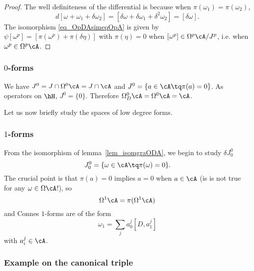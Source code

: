 \begin{proof}
	The well definiteness of the differential is because when $\pi(\omega_1)=\pi(\omega_2)$,
	\[
		d[\omega+\omega_1+\delta\omega_2]=[\delta\omega+\delta\omega_1+\delta^2\omega_2]
		=[\delta\omega].
	\]
	The isomorphism \eqref{eq_OpDAsimeqOpA} is given by   $\psi[\omega^p]=[\pi(\omega^p)+\pi(\delta\eta)]$ with $\pi(\eta)=0$ when $[\omega^p]\in\Omega^p\cA/J^p$, i.e. when $\omega^p\in\Omega^p\cA$.
\end{proof}

\subsubsection{\texorpdfstring{$0$}{t}-forms}

We have $J^0=J\cap\Omega^0\cA=J\cap\cA$ and $J^0=\{ a\in\cA\tq \pi(a)=0 \}$. As operators on $\hH$, $J^0=\{ 0 \}$. Therefore $\Omega^0_D\cA=\Omega^0\cA=\cA$.

Let us now briefly study the spaces of low degree forms.

\subsubsection{\texorpdfstring{$1$}{1}-forms}

From the isomorphism of lemma~\ref{lem_isomgraODA}, we begin to study $\delta J_0^0$
\[
	J_0^0=\{ \omega\in\cA\tq\pi(\omega)=0 \}.
\]
The crucial point is that $\pi(a)=0$ implies $a=0$ when $a\in\cA$ (is is not true for any $\omega\in\Omega\cA$!), so
\begin{equation}
	\Omega^1\cA=\pi(\Omega^1\cA)
\end{equation}
and Connes $1$-forms are of the form
\[
	\omega_1=\sum_ja_0^j[D,a_1^j]
\]
with $a_i^j\in\cA$.

\subsubsection{Example on the canonical triple}


